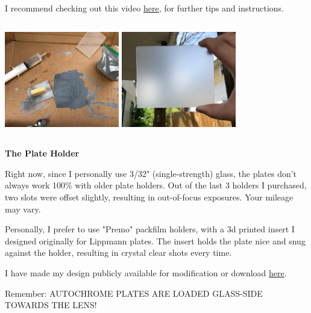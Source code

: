 \documentclass[11pt]{article}
\begin{document}
I recommend checking out this video \href{https://www.youtube.com/watch?v=hxC48_sd6BM}{here}, for further tips and instructions.\newline

\begin{center}
\includegraphics[width=5cm, height=5cm]{img/part3_1.jpg}
\includegraphics[width=5cm, height=5cm]{img/part3_2.jpg}
\end{center}

\textbf{The Plate Holder}\newline

Right now, since I personally use 3/32" (single-strength) glass, the plates don't always work 100\% with older plate holders. Out of the last 3 holders I purchased, two slots were offset slightly, resulting in out-of-focus exposures. Your mileage may vary.\newline

Personally, I prefer to use "Premo" packfilm holders, with a 3d printed insert I designed originally for Lippmann plates. The insert holds the plate nice and snug against the holder, resulting in crystal clear shots every time.\newline

I have made my design publicly available for modification or download \href{https://www.tinkercad.com/things/66n26SZCvrX}{here}.\newline

Remember: AUTOCHROME PLATES ARE LOADED GLASS-SIDE TOWARDS THE LENS!\newline
\end{document}

